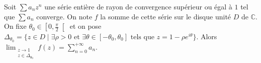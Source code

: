 





	\begin{theorem}
		\label{theoreme-d-abel-angulaire-1}
		Soit $\sum a_n z^n$ une série entière de rayon de convergence supérieur ou égal à $1$ tel que $\sum a_n$ converge. On note $f$ la somme de cette série sur le disque unité $D$ de $\mathbb{C}$. On fixe $\theta_0 \in \left[ 0, \frac{\pi}{2} \right[$ et on pose $\Delta_{\theta_0} = \{ z \in D \mid \exists \rho > 0 \text{ et } \exists \theta \in [-\theta_0, \theta_0] \text{ tels que } z = 1 - \rho e^{i\theta} \}$.
		Alors $\lim_{\substack{z \rightarrow 1 \\ z \in \Delta_{\theta_0}}} f(z) = \sum_{n=0}^{+\infty} a_n$.
	\end{theorem}

